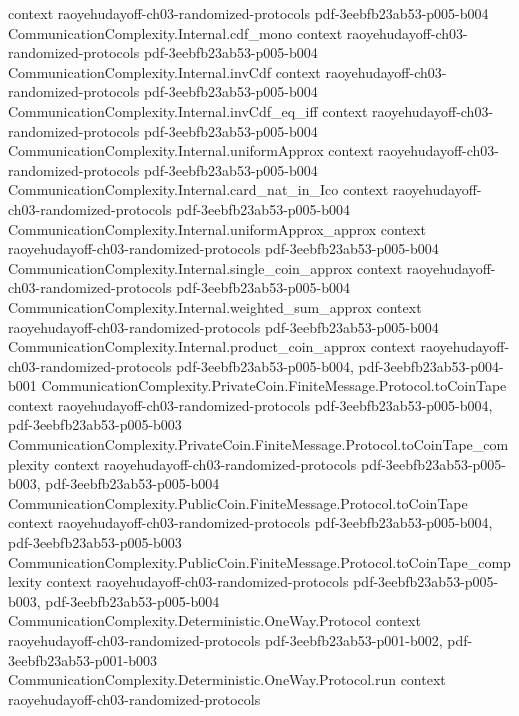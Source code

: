\begin{theorem}
  {context}
  {raoyehudayoff-ch03-randomized-protocols}
  {pdf-3eebfb23ab53-p005-b004}
\proofstep
  {CommunicationComplexity.Internal.cdf_mono}
  {context}
  {raoyehudayoff-ch03-randomized-protocols}
  {pdf-3eebfb23ab53-p005-b004}
\proofstep
  {CommunicationComplexity.Internal.invCdf}
  {context}
  {raoyehudayoff-ch03-randomized-protocols}
  {pdf-3eebfb23ab53-p005-b004}
\proofstep
  {CommunicationComplexity.Internal.invCdf_eq_iff}
  {context}
  {raoyehudayoff-ch03-randomized-protocols}
  {pdf-3eebfb23ab53-p005-b004}
\proofstep
  {CommunicationComplexity.Internal.uniformApprox}
  {context}
  {raoyehudayoff-ch03-randomized-protocols}
  {pdf-3eebfb23ab53-p005-b004}
\proofstep
  {CommunicationComplexity.Internal.card_nat_in_Ico}
  {context}
  {raoyehudayoff-ch03-randomized-protocols}
  {pdf-3eebfb23ab53-p005-b004}
\proofstep
  {CommunicationComplexity.Internal.uniformApprox_approx}
  {context}
  {raoyehudayoff-ch03-randomized-protocols}
  {pdf-3eebfb23ab53-p005-b004}
\proofstep
  {CommunicationComplexity.Internal.single_coin_approx}
  {context}
  {raoyehudayoff-ch03-randomized-protocols}
  {pdf-3eebfb23ab53-p005-b004}
\proofstep
  {CommunicationComplexity.Internal.weighted_sum_approx}
  {context}
  {raoyehudayoff-ch03-randomized-protocols}
  {pdf-3eebfb23ab53-p005-b004}
\proofstep
  {CommunicationComplexity.Internal.product_coin_approx}
  {context}
  {raoyehudayoff-ch03-randomized-protocols}
  {pdf-3eebfb23ab53-p005-b004,
    pdf-3eebfb23ab53-p004-b001}
\proofstep
  {CommunicationComplexity.PrivateCoin.FiniteMessage.Protocol.toCoinTape}
  {context}
  {raoyehudayoff-ch03-randomized-protocols}
  {pdf-3eebfb23ab53-p005-b004,
    pdf-3eebfb23ab53-p005-b003}
\proofstep
  {CommunicationComplexity.PrivateCoin.FiniteMessage.Protocol.toCoinTape_complexity}
  {context}
  {raoyehudayoff-ch03-randomized-protocols}
  {pdf-3eebfb23ab53-p005-b003,
    pdf-3eebfb23ab53-p005-b004}
\proofstep
  {CommunicationComplexity.PublicCoin.FiniteMessage.Protocol.toCoinTape}
  {context}
  {raoyehudayoff-ch03-randomized-protocols}
  {pdf-3eebfb23ab53-p005-b004,
    pdf-3eebfb23ab53-p005-b003}
\proofstep
  {CommunicationComplexity.PublicCoin.FiniteMessage.Protocol.toCoinTape_complexity}
  {context}
  {raoyehudayoff-ch03-randomized-protocols}
  {pdf-3eebfb23ab53-p005-b003,
    pdf-3eebfb23ab53-p005-b004}
\proofstep
  {CommunicationComplexity.Deterministic.OneWay.Protocol}
  {context}
  {raoyehudayoff-ch03-randomized-protocols}
  {pdf-3eebfb23ab53-p001-b002,
    pdf-3eebfb23ab53-p001-b003}
\proofstep
  {CommunicationComplexity.Deterministic.OneWay.Protocol.run}
  {context}
  {raoyehudayoff-ch03-randomized-protocols}

\end{theorem}
